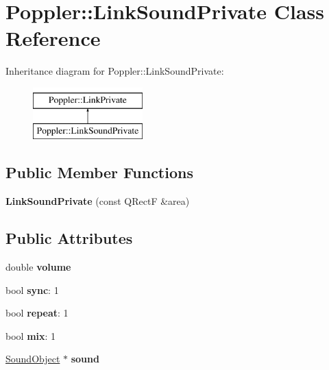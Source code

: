 \hypertarget{class_poppler_1_1_link_sound_private}{}\section{Poppler\+:\+:Link\+Sound\+Private Class Reference}
\label{class_poppler_1_1_link_sound_private}
Inheritance diagram for Poppler\+:\+:Link\+Sound\+Private\+:\begin{figure}[H]
\begin{center}
\leavevmode
\includegraphics[height=2.000000cm]{class_poppler_1_1_link_sound_private}
\end{center}
\end{figure}
\subsection*{Public Member Functions}
\begin{DoxyCompactItemize}
\item 
\mbox{\label{class_poppler_1_1_link_sound_private_a8ffed4b8e7c0627d3098215c2d126f9b}} 
{\bfseries Link\+Sound\+Private} (const Q\+RectF \&area)
\end{DoxyCompactItemize}
\subsection*{Public Attributes}
\begin{DoxyCompactItemize}
\item 
\mbox{\label{class_poppler_1_1_link_sound_private_a24361cab37ab95aecf2143a6cebaf405}} 
double {\bfseries volume}
\item 
\mbox{\label{class_poppler_1_1_link_sound_private_a0477c4fba57740d5666962757a1e32f8}} 
bool {\bfseries sync}\+: 1
\item 
\mbox{\label{class_poppler_1_1_link_sound_private_a76e37ad33c6f8c509abcfcab69f1a22a}} 
bool {\bfseries repeat}\+: 1
\item 
\mbox{\label{class_poppler_1_1_link_sound_private_a3d7b1946269e182595ba0acb87c642e0}} 
bool {\bfseries mix}\+: 1
\item 
\mbox{\label{class_poppler_1_1_link_sound_private_afb0a78b779662c620fc935ba2156901a}} 
\hyperlink{class_poppler_1_1_sound_object}{Sound\+Object} $\ast$ {\bfseries sound}
\end{DoxyCompactItemize}


